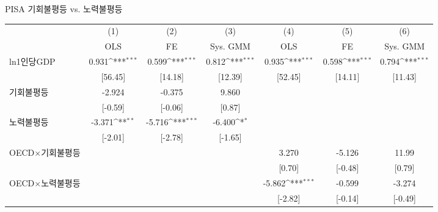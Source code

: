 \centering
\def\sym#1{\ifmmode^{#1}\else\(^{#1}\)\fi}
\caption{PISA 기회불평등 vs. 노력불평등\label{tab:pisacomp}}
\begin{tabular}{l*{6}{c}}
\toprule
                    &\multicolumn{1}{c}{(1)}&\multicolumn{1}{c}{(2)}&\multicolumn{1}{c}{(3)}&\multicolumn{1}{c}{(4)}&\multicolumn{1}{c}{(5)}&\multicolumn{1}{c}{(6)}\\ &\multicolumn{1}{c}{OLS}&\multicolumn{1}{c}{FE}&\multicolumn{1}{c}{Sys. GMM}&\multicolumn{1}{c}{OLS}&\multicolumn{1}{c}{FE}&\multicolumn{1}{c}{Sys. GMM}\\
\midrule
ln1인당GDP        &       0.931\sym{***}&       0.599\sym{***}&       0.812\sym{***}&       0.935\sym{***}&       0.598\sym{***}&       0.794\sym{***}\\
                    &     [56.45]         &     [14.18]         &     [12.39]         &     [52.45]         &     [14.11]         &     [11.43]         \\
\addlinespace
기회불평등        &      -2.924         &      -0.375         &       9.860         &                     &                     &                     \\
                    &     [-0.59]         &     [-0.06]         &      [0.87]         &                     &                     &                     \\
\addlinespace
노력불평등        &      -3.371\sym{**} &      -5.716\sym{***}&      -6.400\sym{*}  &                     &                     &                     \\
                    &     [-2.01]         &     [-2.78]         &     [-1.65]         &                     &                     &                     \\
\addlinespace
OECD$\times$기회불평등&                     &                     &                     &       3.270         &      -5.126         &       11.99         \\
                    &                     &                     &                     &      [0.70]         &     [-0.48]         &      [0.79]         \\
\addlinespace
OECD$\times$노력불평등&                     &                     &                     &      -5.862\sym{***}&      -0.599         &      -3.274         \\
                    &                     &                     &                     &     [-2.82]         &     [-0.14]         &     [-0.49]         \\

\end{tabular}
